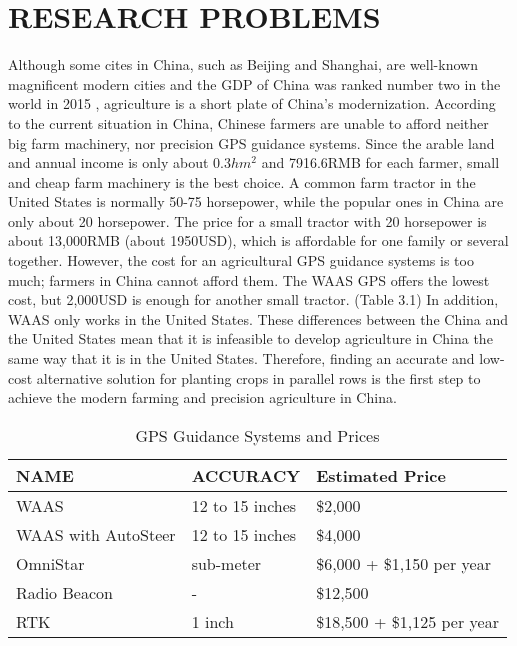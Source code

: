 \chapter{RESEARCH PROBLEMS}
Although some cites in China, such as Beijing and Shanghai, are well-known magnificent modern cities and the GDP of China was ranked number two in the world in 2015 \cite{GDP2015}, agriculture is a short plate of China's modernization. According to the current situation in China, Chinese farmers are unable to afford neither big farm machinery, nor precision GPS guidance systems. Since the arable land and annual income is only about 0.3$hm^{2}$ and 7916.6RMB for each farmer, small and cheap farm machinery is the best choice. A common farm tractor in the United States is normally 50-75 horsepower, while the popular ones in China are only about 20 horsepower. The price for a small tractor with 20 horsepower is about 13,000RMB (about 1950USD), which is affordable for one family or several together. However, the cost for an agricultural GPS guidance systems is too much; farmers in China cannot afford them. The WAAS GPS offers the lowest cost, but 2,000USD is enough for another small tractor. (Table 3.1) In addition, WAAS only works in the United States. These differences between the China and the United States mean that it is infeasible to develop agriculture in China the same way that it is in the United States. Therefore, finding an accurate and low-cost alternative solution for planting crops in parallel rows is the first step to achieve the modern farming and precision agriculture in China.

\begin{table}[ht!]
\caption{GPS Guidance Systems and Prices \cite{PriceR}}
\begin{center}	
\begin{tabular}{|l|l|l|}
\hline
NAME & ACCURACY & Estimated Price \\ 
\hline
WAAS & 12 to 15 inches & \$2,000 \\
\hline
WAAS with AutoSteer &  12 to 15 inches & \$4,000\\
\hline
OmniStar & sub-meter & \$6,000 + \$1,150 per year\\
\hline
Radio Beacon & - & \$12,500\\
\hline
RTK & 1 inch & \$18,500 + \$1,125 per year\\
\hline

\end{tabular}
\end{center}					
\end{table}

